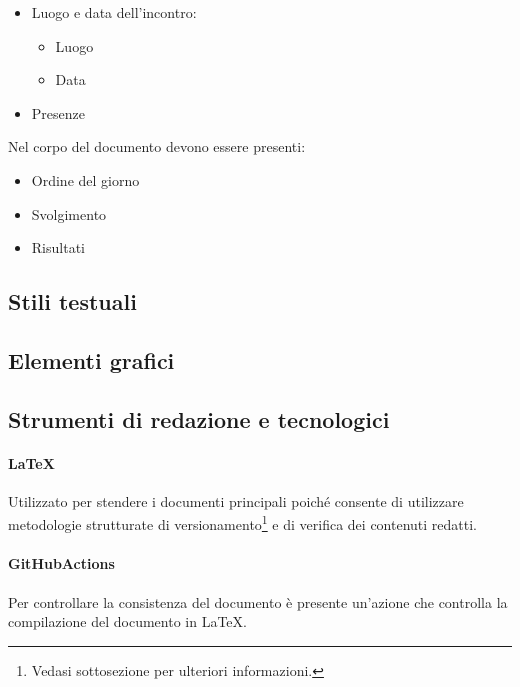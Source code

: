 \begin{itemize}
    \item Luogo e data dell'incontro:
	\begin{itemize}
		\item Luogo
		\item Data
	\end{itemize}
	\item Presenze
\end{itemize}

Nel corpo del documento devono essere presenti:

\begin{itemize}
    \item Ordine del giorno
    \item Svolgimento
    \item Risultati
\end{itemize}


\subsection{Stili testuali}
\subsection{Elementi grafici}
\subsection{Strumenti di redazione e tecnologici}

\paragraph{LaTeX} Utilizzato per stendere i documenti principali poiché consente di utilizzare metodologie strutturate di versionamento\footnote{Vedasi sottosezione  per ulteriori informazioni.} e di verifica dei contenuti redatti.

\paragraph{GitHubActions} Per controllare la consistenza del documento è presente un'azione che controlla la compilazione del documento in LaTeX.
